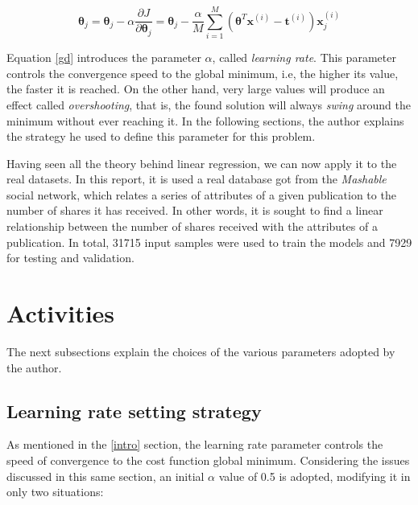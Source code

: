 \documentclass[10pt,twocolumn,letterpaper]{article}
\begin{document}
\begin{equation}
\label {gd}
\bm{\theta}_j = \bm{\theta}_j - \alpha\frac{\partial J}{\partial \bm{\theta}_j } = \bm{\theta}_j - \frac{\alpha}{M} \displaystyle\sum_{i=1}^{M} \left(\bm{\theta}^T\bm{x}^{(i)} - \bm{t}^{(i)}\right)\bm{x}_j^{(i)}
\end{equation}

Equation \ref {gd} introduces the parameter \(\alpha\), called \textit {learning rate}. This parameter controls the convergence speed to the global minimum, i.e, the higher its value, the faster it is reached. On the other hand, very large values will produce an effect called \textit {overshooting}, that is, the found solution will always \textit {swing} around the minimum without ever reaching it. In the following sections, the author explains the strategy he used to define this parameter for this problem.

Having seen all the theory behind linear regression, we can now apply it to the real datasets. In this report, it is used a real database \cite {database} got from the \textit{Mashable} social network, which relates a series of attributes of a given publication to the number of shares it has received. In other words, it is sought to find a linear relationship between the number of shares received with the attributes of a publication. In total, 31715 input samples were used to train the models and 7929 for testing and validation.

\section{Activities}

The next subsections explain the choices of the various parameters adopted by the author.

\subsection{Learning rate setting strategy}
\label{sec:ajuste}

As mentioned in the \ref{intro} section, the learning rate parameter controls the speed of convergence to the cost function global minimum. Considering the issues discussed in this same section, an initial \(\alpha\) value of 0.5 is adopted, modifying it in only two situations:
\end{document}
